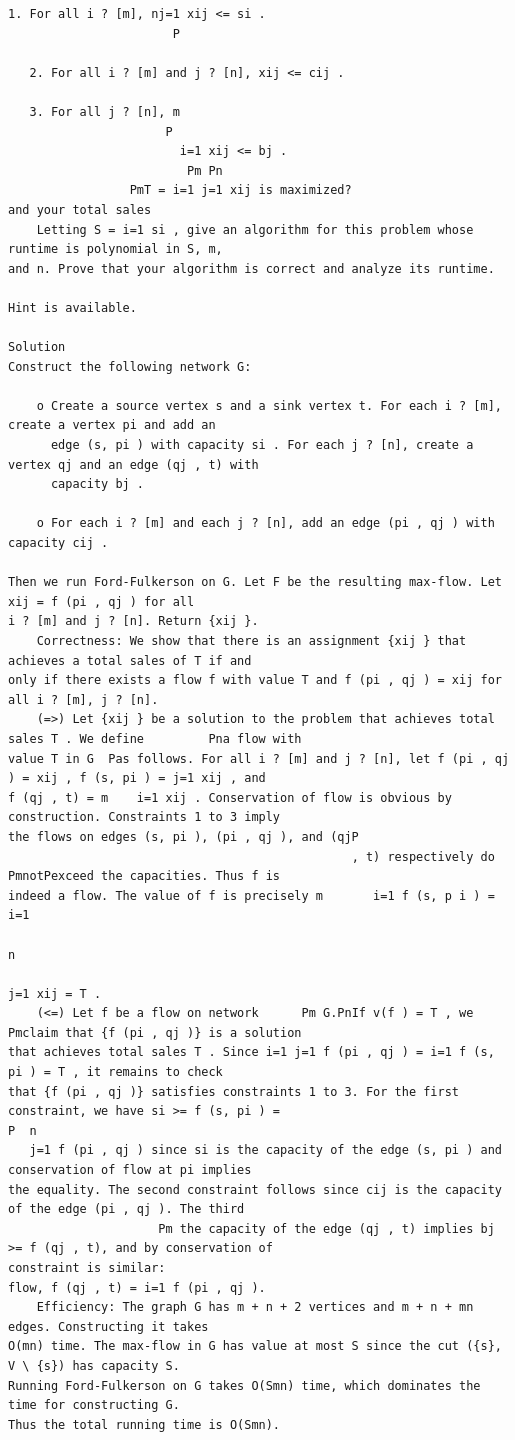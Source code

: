\documentclass[12pt]{article}
\begin{document}
\begin{Verbatim}[breaklines=true,fontsize=\small]
   1. For all i ? [m], nj=1 xij <= si .
                       P

   2. For all i ? [m] and j ? [n], xij <= cij .

   3. For all j ? [n], m
                      P
                        i=1 xij <= bj .
                         Pm Pn
                 PmT = i=1 j=1 xij is maximized?
and your total sales
    Letting S = i=1 si , give an algorithm for this problem whose runtime is polynomial in S, m,
and n. Prove that your algorithm is correct and analyze its runtime.

Hint is available.

Solution
Construct the following network G:

    o Create a source vertex s and a sink vertex t. For each i ? [m], create a vertex pi and add an
      edge (s, pi ) with capacity si . For each j ? [n], create a vertex qj and an edge (qj , t) with
      capacity bj .

    o For each i ? [m] and each j ? [n], add an edge (pi , qj ) with capacity cij .

Then we run Ford-Fulkerson on G. Let F be the resulting max-flow. Let xij = f (pi , qj ) for all
i ? [m] and j ? [n]. Return {xij }.
    Correctness: We show that there is an assignment {xij } that achieves a total sales of T if and
only if there exists a flow f with value T and f (pi , qj ) = xij for all i ? [m], j ? [n].
    (=>) Let {xij } be a solution to the problem that achieves total sales T . We define         Pna flow with
value T in G  Pas follows. For all i ? [m] and j ? [n], let f (pi , qj ) = xij , f (s, pi ) = j=1 xij , and
f (qj , t) = m    i=1 xij . Conservation of flow is obvious by construction. Constraints 1 to 3 imply
the flows on edges (s, pi ), (pi , qj ), and (qjP
                                                , t) respectively do PmnotPexceed the capacities. Thus f is
indeed a flow. The value of f is precisely m       i=1 f (s, p i ) =  i=1
                                                                             n
                                                                             j=1 xij = T .
    (<=) Let f be a flow on network      Pm G.PnIf v(f ) = T , we     Pmclaim that {f (pi , qj )} is a solution
that achieves total sales T . Since i=1 j=1 f (pi , qj ) = i=1 f (s, pi ) = T , it remains to check
that {f (pi , qj )} satisfies constraints 1 to 3. For the first constraint, we have si >= f (s, pi ) =
P  n
   j=1 f (pi , qj ) since si is the capacity of the edge (s, pi ) and conservation of flow at pi implies
the equality. The second constraint follows since cij is the capacity of the edge (pi , qj ). The third
                     Pm the capacity of the edge (qj , t) implies bj >= f (qj , t), and by conservation of
constraint is similar:
flow, f (qj , t) = i=1 f (pi , qj ).
    Efficiency: The graph G has m + n + 2 vertices and m + n + mn edges. Constructing it takes
O(mn) time. The max-flow in G has value at most S since the cut ({s}, V \ {s}) has capacity S.
Running Ford-Fulkerson on G takes O(Smn) time, which dominates the time for constructing G.
Thus the total running time is O(Smn).



\end{Verbatim}
\end{document}
